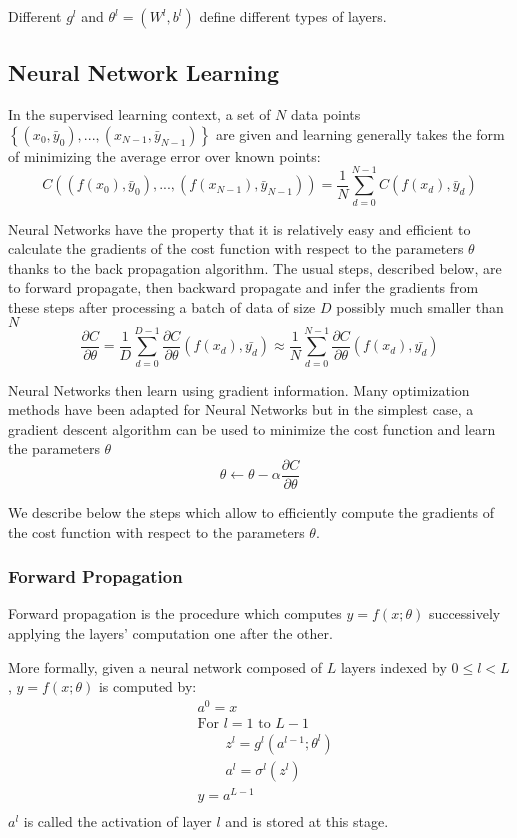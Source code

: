 \documentclass{article} %
\begin{document}
Different $g^l$ and $\theta^l=(W^l, b^l)$ define different types of layers.

\subsection{Neural Network Learning}
In the supervised learning context, a set of $N$ data points $\left\lbrace( x_0,\bar{y}_0 ),...,( x_{N-1}, \bar{y}_{N-1})\right\rbrace$ are given and learning generally takes the form of minimizing the average error over known points:
$$
C\left(\left( f(x_0),\bar{y}_0 \right),...,\left( f(x_{N-1}),\bar{y}_{N-1}\right)\right) = \frac{1}{N} \sum_{d=0}^{N-1} C(f(x_d),\bar{y}_d)
$$

Neural Networks have the property that it is relatively easy and efficient to calculate the gradients of the cost function with respect to the parameters $\theta$ thanks to the back propagation algorithm. The usual steps, described below, are to forward propagate, then backward propagate and infer the gradients from these steps after processing a batch of data of size $D$ possibly much smaller than $N$
$$
\frac{\partial C}{\partial \theta} = \frac{1}{D}\sum_{d=0}^{D-1} \frac{\partial C}{\partial \theta}(f(x_d),\bar{y_d}) \approx \frac{1}{N} \sum_{d=0}^{N-1}\frac{\partial C}{\partial \theta}(f(x_d),\bar{y_d})
$$

Neural Networks then learn using gradient information. Many optimization methods have been adapted for Neural Networks but in the simplest case, a gradient descent algorithm can be used to minimize the cost function and learn the parameters $\theta$
$$
\theta \leftarrow \theta - \alpha \frac{\partial C}{\partial \theta}
$$

We describe below the steps which allow to efficiently compute the gradients of the cost function with respect to the parameters $\theta$.

\subsubsection{Forward Propagation}
Forward propagation is the procedure which computes $y = f(x;\theta)$ successively applying the layers' computation one after the other.

More formally, given a neural network composed of $L$ layers indexed by $0\leq l < L$, $y = f(x;\theta)$ is computed by:
$$
\begin{aligned}
&a^{0} = x\\
&\text{For }l=1\text{ to }L-1\\
&\qquad z^l = g^l(a^{l-1};\theta^l)\\
&\qquad a^l = \sigma^l(z^l)\\
&y = a^{L-1}\\
\end{aligned}
$$
$a^l$ is called the activation of layer $l$ and is stored at this stage.
\end{document}
